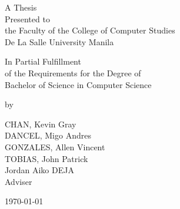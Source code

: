 %
%
%                 

\begin{titlepage}
\centering



\vspace{1.3cm}
A Thesis\\
Presented to\\
the Faculty of the College of Computer Studies\\
De La Salle University Manila

\vspace{1.3cm}
In Partial Fulfillment\\
of the Requirements for the Degree of\\
Bachelor of  Science in Computer Science

\vspace{1.3cm}
by\\
\vspace{1cm}

CHAN, Kevin Gray \\
DANCEL, Migo Andres  \\
GONZALES, Allen Vincent  \\
TOBIAS, John Patrick  \\

\vspace{1.3cm}
Jordan Aiko DEJA \\
Adviser

\vspace{1.3cm}
\today
\end{titlepage}

